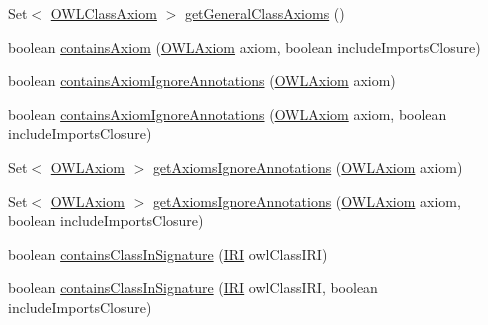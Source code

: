 \begin{DoxyCompactItemize}
\item 
Set$<$ \hyperlink{interfaceorg_1_1semanticweb_1_1owlapi_1_1model_1_1_o_w_l_class_axiom}{O\-W\-L\-Class\-Axiom} $>$ \hyperlink{classuk_1_1ac_1_1manchester_1_1cs_1_1owl_1_1owlapi_1_1_o_w_l_ontology_impl_ac8c41f07e12fc42476c0bbba91a59c4d}{get\-General\-Class\-Axioms} ()
\item 
boolean \hyperlink{classuk_1_1ac_1_1manchester_1_1cs_1_1owl_1_1owlapi_1_1_o_w_l_ontology_impl_a1fec742faa555da37732a8cde1ce4543}{contains\-Axiom} (\hyperlink{interfaceorg_1_1semanticweb_1_1owlapi_1_1model_1_1_o_w_l_axiom}{O\-W\-L\-Axiom} axiom, boolean include\-Imports\-Closure)
\item 
boolean \hyperlink{classuk_1_1ac_1_1manchester_1_1cs_1_1owl_1_1owlapi_1_1_o_w_l_ontology_impl_ad7ccfc047d448a306e698f867a33328a}{contains\-Axiom\-Ignore\-Annotations} (\hyperlink{interfaceorg_1_1semanticweb_1_1owlapi_1_1model_1_1_o_w_l_axiom}{O\-W\-L\-Axiom} axiom)
\item 
boolean \hyperlink{classuk_1_1ac_1_1manchester_1_1cs_1_1owl_1_1owlapi_1_1_o_w_l_ontology_impl_a4ec41cb888e2c648bc664cf9e60b6cc8}{contains\-Axiom\-Ignore\-Annotations} (\hyperlink{interfaceorg_1_1semanticweb_1_1owlapi_1_1model_1_1_o_w_l_axiom}{O\-W\-L\-Axiom} axiom, boolean include\-Imports\-Closure)
\item 
Set$<$ \hyperlink{interfaceorg_1_1semanticweb_1_1owlapi_1_1model_1_1_o_w_l_axiom}{O\-W\-L\-Axiom} $>$ \hyperlink{classuk_1_1ac_1_1manchester_1_1cs_1_1owl_1_1owlapi_1_1_o_w_l_ontology_impl_a85ada1a990fe71435590d98a1eedd2bd}{get\-Axioms\-Ignore\-Annotations} (\hyperlink{interfaceorg_1_1semanticweb_1_1owlapi_1_1model_1_1_o_w_l_axiom}{O\-W\-L\-Axiom} axiom)
\item 
Set$<$ \hyperlink{interfaceorg_1_1semanticweb_1_1owlapi_1_1model_1_1_o_w_l_axiom}{O\-W\-L\-Axiom} $>$ \hyperlink{classuk_1_1ac_1_1manchester_1_1cs_1_1owl_1_1owlapi_1_1_o_w_l_ontology_impl_addad6993c43d9f9aa28ec0f10d12b0fb}{get\-Axioms\-Ignore\-Annotations} (\hyperlink{interfaceorg_1_1semanticweb_1_1owlapi_1_1model_1_1_o_w_l_axiom}{O\-W\-L\-Axiom} axiom, boolean include\-Imports\-Closure)
\item 
boolean \hyperlink{classuk_1_1ac_1_1manchester_1_1cs_1_1owl_1_1owlapi_1_1_o_w_l_ontology_impl_a7a6207338f01c46e2b15b3c2e950ebe9}{contains\-Class\-In\-Signature} (\hyperlink{classorg_1_1semanticweb_1_1owlapi_1_1model_1_1_i_r_i}{I\-R\-I} owl\-Class\-I\-R\-I)
\item 
boolean \hyperlink{classuk_1_1ac_1_1manchester_1_1cs_1_1owl_1_1owlapi_1_1_o_w_l_ontology_impl_a102c1fd5b734d6865ea89907d221f383}{contains\-Class\-In\-Signature} (\hyperlink{classorg_1_1semanticweb_1_1owlapi_1_1model_1_1_i_r_i}{I\-R\-I} owl\-Class\-I\-R\-I, boolean include\-Imports\-Closure)

\end{DoxyCompactItemize}
